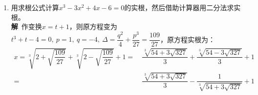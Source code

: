 \begin{enumerate}[label={【\textbf{例\thechapter.\arabic*}】},
 leftmargin=\inteval{\myenumleftmargin}pt,
 itemsep=\inteval{\myenumitempsep}pt,
 itemindent=\inteval{\myenumitemindent}pt]
%
因为$ \cos f(x+T)=\cos f(x) $，所以必有
\begin{gather} \label{2015上海解法二1}
    f(x+T)= f(x) +2k\pi,\q k\in \textbf{N}^+ 
\end{gather}
或者
\begin{gather}\label{2015上海解法二2}
    f(x+T)= 2k\pi-f(x),\q k\in \textbf{N}^+
\end{gather}
因为(\ref{2015上海解法二2})式左侧关于$ x $单调递增，
右侧关于$ x $单调递减，矛盾，所以(\ref{2015上海解法二2})式
不可能成立。

在(\ref{2015上海解法二1})式中令$ x=0 $可得：$ f(T)=f(0)+2k\pi $，
所以$ k=2 $，
\begin{gather*}
    f(x+T)=f(x)+4\pi=f(x)+f(T)
\end{gather*}

是否可能出现如下情况呢？比如存在$ t\in(0,T) $，
存在$ x_1\in(0,t),x_2\in (t,T) $，使得
\begin{align}
    f(x_1+T) &= f(x_1) +2k_1\pi,\q k_1\in \textbf{N}^+ \label{2015上海解法二3}  \\
    f(x_2+T) &= f(x_2) +2k_2\pi,\q k_2\in \textbf{N}^+ \label{2015上海解法二4}
\end{align}
其中$ k_1\neq k_2 $. 
回答是不可能。假如(\ref{2015上海解法二3}),(\ref{2015上海解法二4})
两式都成立，那么在$ x=t+T $处，$ f(x) $的左右极限不相等。
又因为$ f(x) $是单调递增的，说明$ f(x) $在$ x=t+T $处出现了一个
向上的跳跃(或称“间断”)，此时，$ f(x) $的值域就达不到\textbf{R}，
与题意矛盾。证毕。\\
\textbf{注}\ $ f(x+T)=f(x)+f(T) $与正比例函数的函数方程
$ f(x+y)=f(x)+f(y) $很相似，但我们并不能得出$ f(x) $
在$ (0,T) $上是正比例函数的结论，因为$ T $是固定的，而
$ y $是任意的。只能得出如下结论：
$ f(x) $在$ (T,2T) $上的图像是由$ f(x) $在$ (0,T) $
上的图像向右平移$ T $，再向上平移$ f(T)=2k\pi $得到的。
其它区间类似。比如$ f(x) $的一种可能的图像如下：
\begin{figure}[!ht]
    \centering
    \texttt{[image: 2015上海高考]}
\end{figure}

\item 用求根公式计算$ x^3-3x^2+4x-6=0 $的实根，然后借助计算器用二分法求实根。\\
\textbf{解}\ 作变换$ x=t+1 $，则原方程变为$ t^3+t-4=0,\ p=1,\ q=-4,\ 
\Delta=\dfrac{q^2}{4}+\dfrac{p^3}{27}=\dfrac{109}{27} $，原方程实根为：
\begin{align*}
    x =\sqrt[3]{2+\sqrt{\dfrac{109}{27}}}+\sqrt[3]{2-\sqrt{\dfrac{109}{27}}}+1  
    =&\  \dfrac{\sqrt[3]{54+3\sqrt{327}}}{3}+\dfrac{\sqrt[3]{54-3\sqrt{327}}}{3}+1 \\
    =&\  \dfrac{\sqrt[3]{54+3\sqrt{327}}}{3}-\dfrac{1}{\sqrt[3]{54+3\sqrt{327}}}+1
\end{align*}


\end{enumerate}
